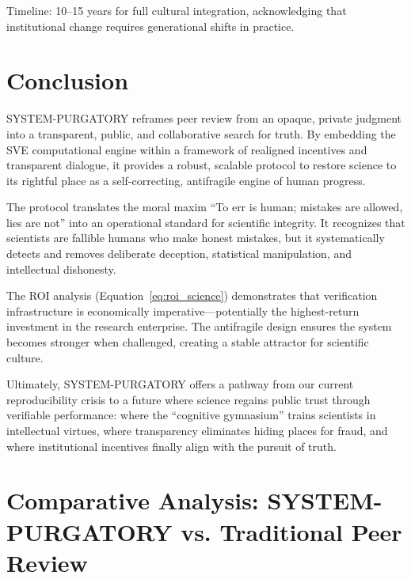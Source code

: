 \documentclass[11pt,a4paper]{article}
\begin{document}
\begin{small}
Timeline: 10--15 years for full cultural integration, acknowledging that institutional change requires generational shifts in practice.

\section{Conclusion}
SYSTEM-PURGATORY reframes peer review from an opaque, private judgment into a transparent, public, and collaborative search for truth. By embedding the SVE computational engine within a framework of realigned incentives and transparent dialogue, it provides a robust, scalable protocol to restore science to its rightful place as a self-correcting, antifragile engine of human progress.

The protocol translates the moral maxim ``To err is human; mistakes are allowed, lies are not'' into an operational standard for scientific integrity. It recognizes that scientists are fallible humans who make honest mistakes, but it systematically detects and removes deliberate deception, statistical manipulation, and intellectual dishonesty.

The ROI analysis (Equation~\eqref{eq:roi_science}) demonstrates that verification infrastructure is economically imperative—potentially the highest-return investment in the research enterprise. The antifragile design ensures the system becomes stronger when challenged, creating a stable attractor for scientific culture.

Ultimately, SYSTEM-PURGATORY offers a pathway from our current reproducibility crisis to a future where science regains public trust through verifiable performance: where the ``cognitive gymnasium'' trains scientists in intellectual virtues, where transparency eliminates hiding places for fraud, and where institutional incentives finally align with the pursuit of truth.




\clearpage
\appendix


\section{Comparative Analysis: SYSTEM-PURGATORY vs. Traditional Peer Review}
\label{app:comparison}


\end{small}
\end{document}
